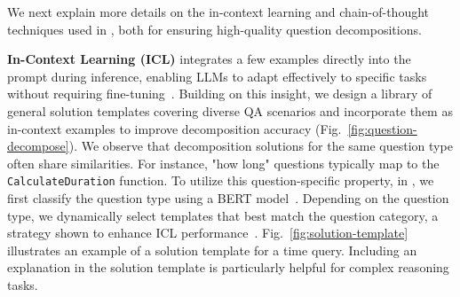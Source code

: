 We next explain more details on the in-context learning and chain-of-thought techniques used in \Method, both for ensuring high-quality question decompositions.







\textbf{In-Context Learning (ICL)} integrates a few examples directly into the prompt during inference, enabling LLMs to adapt effectively to specific tasks without requiring fine-tuning~\cite{alayrac2022flamingo,shao2023prompting}. 
Building on this insight, we design a library of general solution templates covering diverse QA scenarios and incorporate them as in-context examples to improve decomposition accuracy (Fig.~\ref{fig:question-decompose}).
We observe that decomposition solutions for the same question type often share similarities. For instance, "how long" questions typically map to the \texttt{CalculateDuration} function. To utilize this question-specific property, in \Method, we first classify the question type using a BERT model~\cite{devlin2018bert}. Depending on the question type, we dynamically select templates that best match the question category, a strategy shown to enhance ICL performance~\cite{fu2023gpt4aigchip}.
Fig.~\ref{fig:solution-template} illustrates an example of a solution template for a time query. Including an explanation in the solution template is particularly helpful for complex reasoning tasks. %




